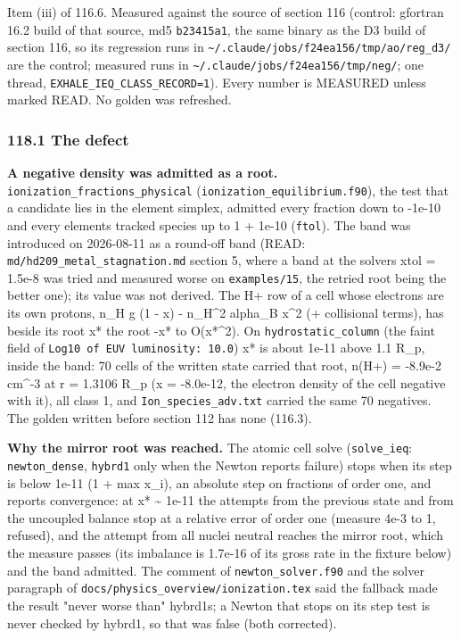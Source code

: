 \documentclass[english,a4paper]{my_memo}
\begin{document}
Item (iii) of 116.6. Measured against the source of section 116 (control:
gfortran 16.2 build of that source, md5 \texttt{b23415a1}, the same binary as the D3
build of section 116, so its regression runs in
\texttt{\textasciitilde{}/.claude/jobs/f24ea156/tmp/ao/reg\_d3/} are the control; measured runs in
\texttt{\textasciitilde{}/.claude/jobs/f24ea156/tmp/neg/}; one thread, \texttt{EXHALE\_IEQ\_CLASS\_RECORD=1}).
Every number is MEASURED unless marked READ. No golden was refreshed.

\subsubsection{118.1 The defect}\label{1181-the-defect}

\textbf{A negative density was admitted as a root.} \texttt{ionization\_fractions\_physical}
(\texttt{ionization\_equilibrium.f90}), the test that a candidate lies in the element
simplex, admitted every fraction down to -1e-10 and every element\textquotesingle s tracked
species up to 1 + 1e-10 (\texttt{ftol}). The band was introduced on 2026-08-11 as a
round-off band (READ: \texttt{md/hd209\_metal\_stagnation.md} section 5, where a band
at the solver\textquotesingle s xtol = 1.5e-8 was tried and measured worse on \texttt{examples/15},
the retried root being the better one); its value was not derived. The H+ row
of a cell whose electrons are its own protons, n\_H g (1 - x) -
n\_H\^{}2 alpha\_B x\^{}2 (+ collisional terms), has beside its root x* the root -x*
to O(x*\^{}2). On \texttt{hydrostatic\_column} (the faint field of \texttt{Log10\ of\ EUV\ luminosity:\ 10.0}) x* is about 1e-11 above 1.1 R\_p, inside the band: 70
cells of the written state carried that root, n(H+) = -8.9e-2 cm\^{}-3 at r =
1.3106 R\_p (x = -8.0e-12, the electron density of the cell negative with it),
all class 1, and \texttt{Ion\_species\_adv.txt} carried the same 70 negatives. The
golden written before section 112 has none (116.3).

\textbf{Why the mirror root was reached.} The atomic cell solve (\texttt{solve\_ieq}:
\texttt{newton\_dense}, \texttt{hybrd1} only when the Newton reports failure) stops when its
step is below 1e-11 (1 + max \textbar x\_i\textbar), an absolute step on fractions of order
one, and reports convergence: at x* \textasciitilde{} 1e-11 the attempts from the previous
state and from the uncoupled balance stop at a relative error of order one
(measure 4e-3 to 1, refused), and the attempt from all nuclei neutral reaches
the mirror root, which the measure passes (its imbalance is 1.7e-16 of its
gross rate in the fixture below) and the band admitted. The comment of
\texttt{newton\_solver.f90} and the solver paragraph of
\texttt{docs/physics\_overview/ionization.tex} said the fallback made the result
"never worse than" hybrd1\textquotesingle s; a Newton that stops on its step test is never
checked by hybrd1, so that was false (both corrected).
\end{document}

